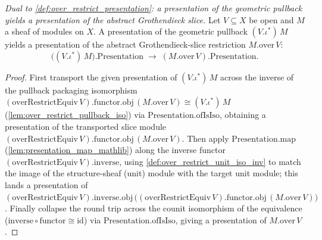 \begin{definition}
  \label{def:over_restrict_presentation_inv}
  \textit{Dual to \cref{def:over_restrict_presentation}: a presentation of the geometric pullback
  yields a presentation of the abstract Grothendieck slice.}
  Let \(V \subseteq X\) be open and \(M\) a sheaf of modules on \(X\). A presentation of the geometric
  pullback \((V.\iota^{*})\,M\) yields a presentation of the abstract Grothendieck-slice restriction
  \(M.\mathrm{over}\,V\):
  \[
    \bigl((V.\iota^{*})\,M\bigr).\mathrm{Presentation}
      \;\longrightarrow\;
    (M.\mathrm{over}\,V).\mathrm{Presentation} .
  \]
\end{definition}
\begin{proof}
  First transport the given presentation of \((V.\iota^{*})\,M\) across the inverse of the pullback
  packaging isomorphism \((\mathrm{overRestrictEquiv}\,V).\mathrm{functor}.\mathrm{obj}\,
  (M.\mathrm{over}\,V) \cong (V.\iota^{*})\,M\) (\cref{lem:over_restrict_pullback_iso}) via
  \(\mathrm{Presentation.ofIsIso}\), obtaining a presentation of the transported slice module
  \((\mathrm{overRestrictEquiv}\,V).\mathrm{functor}.\mathrm{obj}\,(M.\mathrm{over}\,V)\). Then apply
  \(\mathrm{Presentation.map}\) (\cref{lem:presentation_map_mathlib}) along the inverse functor
  \((\mathrm{overRestrictEquiv}\,V).\mathrm{inverse}\), using \cref{def:over_restrict_unit_iso_inv} to
  match the image of the structure-sheaf (unit) module with the target unit module; this lands a
  presentation of \((\mathrm{overRestrictEquiv}\,V).\mathrm{inverse}.\mathrm{obj}\,
  \bigl((\mathrm{overRestrictEquiv}\,V).\mathrm{functor}.\mathrm{obj}\,(M.\mathrm{over}\,V)\bigr)\).
  Finally collapse the round trip across the counit isomorphism of the equivalence
  (\(\mathrm{inverse} \circ \mathrm{functor} \cong \mathrm{id}\)) via \(\mathrm{Presentation.ofIsIso}\),
  giving a presentation of \(M.\mathrm{over}\,V\).
\end{proof}

